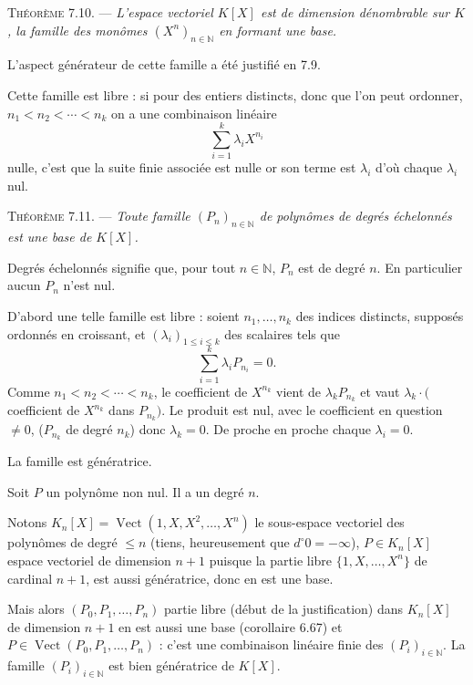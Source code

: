 \medskip\noindent\textsc{Théorème 7.10.} --- \emph{L'espace vectoriel $K[X]$ est de dimension dénombrable sur $K$, la famille des monômes $(X^n)_{n\in\mathbb N}$ en formant une base.}

L'aspect générateur de cette famille a été justifié en 7.9.

Cette famille est libre : si pour des entiers distincts, donc que l'on peut ordonner, $n_1<n_2<\cdots<n_k$ on a une combinaison linéaire
\[
\sum_{i=1}^k\lambda_iX^{n_i}
\]
nulle, c'est que la suite finie associée est nulle or son terme  est $\lambda_i$ d'où chaque $\lambda_i$ nul. \bookend

\medskip\noindent\textsc{Théorème 7.11.} --- \emph{Toute famille $(P_n)_{n\in\mathbb N}$ de polynômes de degrés échelonnés est une base de $K[X]$.}

Degrés échelonnés signifie que, pour tout $n\in\mathbb N$, $P_n$ est de degré $n$. En particulier aucun $P_n$ n'est nul.

D'abord une telle famille est libre : soient $n_1,\ldots,n_k$ des indices distincts, supposés ordonnés en croissant, et $(\lambda_i)_{1\le i\le k}$ des scalaires tels que
\[
\sum_{i=1}^k\lambda_iP_{n_i}=0.
\]
Comme $n_1<n_2<\cdots<n_k$, le coefficient de $X^{n_k}$ vient de $\lambda_kP_{n_k}$ et vaut $\lambda_k\cdot($coefficient de $X^{n_k}$ dans $P_{n_k})$. Le produit est nul, avec le coefficient en question $\ne0$, ($P_{n_k}$ de degré $n_k$) donc $\lambda_k=0$. De proche en proche chaque $\lambda_i=0$.

La famille est génératrice.

Soit $P$ un polynôme non nul. Il a un degré $n$.

Notons $K_n[X]=\operatorname{Vect}(1,X,X^2,\ldots,X^n)$ le sous-espace vectoriel des polynômes de degré $\le n$ (tiens, heureusement que $d^\circ0=-\infty$), $P\in K_n[X]$ espace vectoriel de dimension $n+1$ puisque la partie libre $\{1,X,\ldots,X^n\}$ de cardinal $n+1$, est aussi génératrice, donc en est une base.

Mais alors $(P_0,P_1,\ldots,P_n)$ partie libre (début de la justification) dans $K_n[X]$ de dimension $n+1$ en est aussi une base (corollaire 6.67) et $P\in\operatorname{Vect}(P_0,P_1,\ldots,P_n)$ : c'est une combinaison linéaire finie des $(P_i)_{i\in\mathbb N}$. La famille $(P_i)_{i\in\mathbb N}$ est bien génératrice de $K[X]$. \bookend

